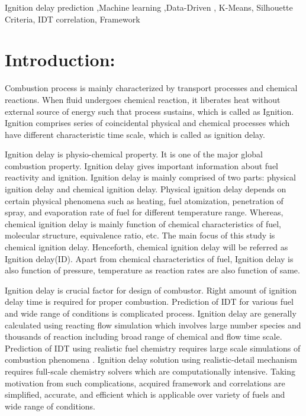 \documentclass[preprint,12pt]{elsarticle}
\begin{document}
\begin{frontmatter}
		\begin{keyword}
			Ignition delay prediction \sep Machine learning \sep Data-Driven , K-Means, Silhouette Criteria, IDT correlation, Framework
			
		\end{keyword}
		
	\end{frontmatter}
	
	\linenumbers
	
	\section{Introduction:}
	\label{S:1}
	Combustion process is mainly characterized by transport processes and chemical reactions. When fluid undergoes chemical reaction, it liberates heat without external source of energy such that process sustains, which is called as Ignition. Ignition comprises series of coincidental physical and chemical processes which have different characteristic time scale, which is called as ignition delay. 
	
	Ignition delay is physio-chemical property. It is one of the major global combustion property. Ignition delay gives important information about fuel reactivity and ignition. Ignition delay is mainly comprised of two parts: physical ignition delay and chemical ignition delay. Physical ignition delay depends on certain physical phenomena such as heating, fuel atomization, penetration of spray, and evaporation rate of fuel for different temperature range. Whereas, chemical ignition delay is mainly function of chemical characteristics of fuel, molecular structure, equivalence ratio, etc. The main focus of this study is chemical ignition delay. Henceforth, chemical ignition delay will be referred as Ignition delay(ID).  Apart from chemical characteristics of fuel, Ignition delay is also function of pressure, temperature as reaction rates are also function of same.

		
		Ignition delay is crucial factor for design of combustor. Right amount of ignition delay time is required for proper combustion. Prediction of IDT for various fuel and wide range of conditions is complicated process. Ignition delay are generally calculated using reacting flow simulation which involves large number species and thousands of reaction including broad range of chemical and flow time scale. Prediction of IDT using realistic fuel chemistry requires large scale simulations of combustion phenomena \cite{computation}. Ignition delay solution using realistic-detail mechanism  requires full-scale chemistry solvers which are computationally intensive. Taking motivation from such complications, acquired framework and correlations are simplified, accurate, and efficient which is  applicable over variety of fuels and wide range of conditions. 
			
\end{document}

